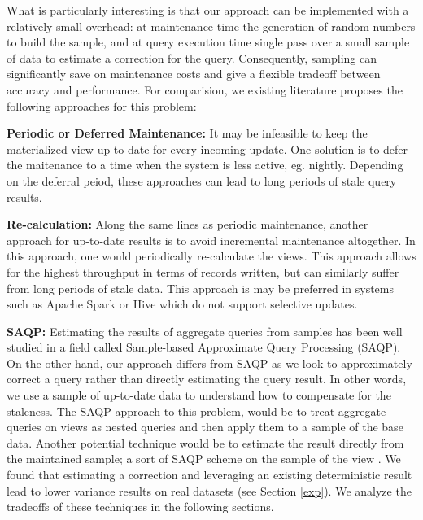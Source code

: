What is particularly interesting is that our approach can be implemented with a relatively small overhead: at maintenance time the generation of random numbers to build the sample, and at query execution time single pass over a small sample of data to estimate a correction for the query.
Consequently, sampling can significantly save on maintenance costs and give a flexible tradeoff between accuracy and performance.
For comparision, we existing literature proposes the following approaches for this problem: 
\vspace{1em}

\noindent\textbf{Periodic or Deferred Maintenance: }
It may be infeasible to keep the materialized view up-to-date for every incoming update.
One solution is to defer the maitenance to a time when the system is less active, eg. nightly.
Depending on the deferral peiod, these approaches can lead to long periods of stale query results.

\vspace{1em}

\noindent\textbf{Re-calculation: }
Along the same lines as periodic maintenance, another approach 
for up-to-date results is to avoid incremental maintenance altogether.
In this approach, one would periodically re-calculate the views.
This approach allows for the highest throughput in terms of records written, but can
similarly suffer from long periods of stale data.
This approach is may be preferred in systems such as Apache Spark or Hive which do not support
selective updates. 

\vspace{1em}

\noindent\textbf{SAQP: }
Estimating the results of aggregate queries from samples has been
well studied in a field called Sample-based Approximate Query Processing
(SAQP). On the other hand, our approach differs from SAQP as we look to
approximately correct a query rather than directly estimating the query result.
In other words, we use a sample of up-to-date data to understand how to compensate for the
staleness. The SAQP approach to this problem, would be to treat aggregate
queries on views as nested queries and then apply them to a sample
of the base data. Another potential technique would be to
estimate the result directly from the maintained sample; a sort of
SAQP scheme on the sample of the view \cite{joshi2008materialized}. We found that estimating
a correction and leveraging an existing deterministic result lead
to lower variance results on real datasets (see Section \ref{exp}). We analyze
the tradeoffs of these techniques in the following sections.

